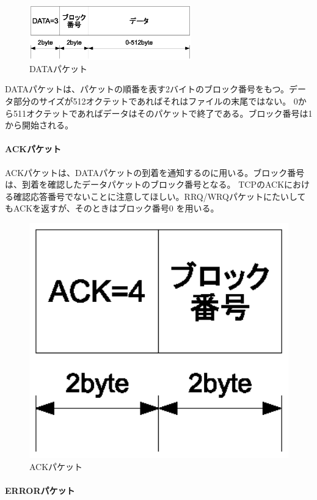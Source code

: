 \begin{figure}[htbp]
	\includegraphics[width=7cm,clip]{draw/tftp_op2.eps}
	\caption{DATAパケット}
	\label{fig:ftfp_op2}
\end{figure}

DATAパケットは、パケットの順番を表す2バイトのブロック番号をもつ。データ部分のサイズが512オクテットであればそれはファイルの末尾ではない。 0から511オクテットであればデータはそのパケットで終了である。ブロック番号は1から開始される。

\paragraph{ACKパケット}

ACKパケットは、DATAパケットの到着を通知するのに用いる。ブロック番号は、到着を確認したデータパケットのブロック番号となる。 TCPのACKにおける確認応答番号でないことに注意してほしい。RRQ/WRQパケットにたいしてもACKを返すが、そのときはブロック番号0 を用いる。

\begin{figure}[htbp]
	\includegraphics[width=12cm,clip]{draw/tftp_op3.eps}
	\caption{ACKパケット}
	\label{fig:ftfp_op3}
\end{figure}

\paragraph{ERRORパケット}

